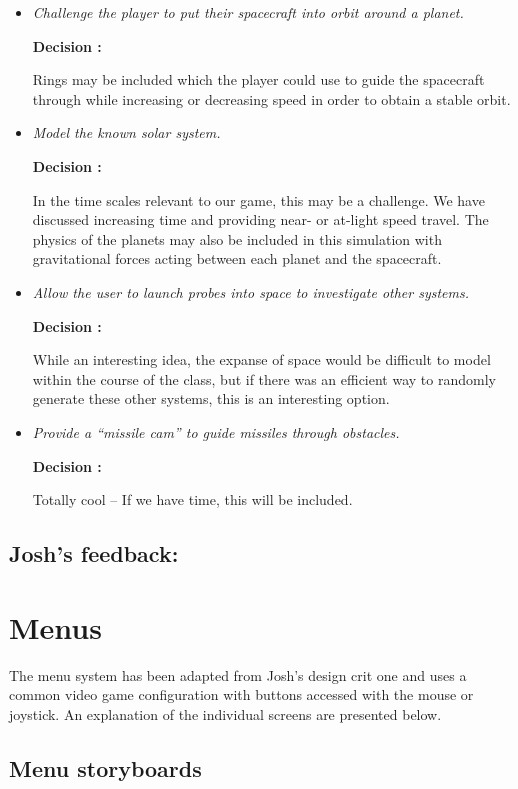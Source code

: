 \begin{itemize}
  \item \emph{Challenge the player to put their spacecraft into orbit around a planet.}
        
        \textbf{Decision : } \parbox[t]{5in}{Rings may be included which the player could use to guide the spacecraft through while increasing or decreasing speed in order to obtain a stable orbit.}

  \item \emph{Model the known solar system.}
        
        \textbf{Decision : } \parbox[t]{5in}{In the time scales relevant to our game, this may be a challenge.  We have discussed increasing time and providing near- or at-light speed travel.  The physics of the planets may also be included in this simulation with gravitational forces acting between each planet and the spacecraft.}

  \item \emph{Allow the user to launch probes into space to investigate other systems.}
        
        \textbf{Decision : } \parbox[t]{5in}{While an interesting idea, the expanse of space would be difficult to model within the course of the class, but if there was an efficient way to randomly generate these other systems, this is an interesting option.}

  \item \emph{Provide a ``missile cam'' to guide missiles through obstacles.}
        
        \textbf{Decision : } \parbox[t]{5in}{Totally cool -- If we have time, this will be included.}
\end{itemize}

\subsection*{Josh's feedback:}

\section*{Menus}

The menu system has been adapted from Josh's design crit one and uses a common video game configuration with buttons accessed with the mouse or joystick.  An explanation of the individual screens are presented below.

\subsection*{Menu storyboards}


